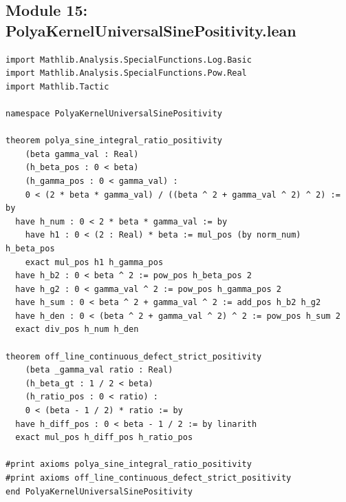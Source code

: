 \documentclass[11pt,a4paper]{article}
\begin{document}
\subsection{Module 15: PolyaKernelUniversalSinePositivity.lean}
\begin{lstlisting}[language=Lean4]
import Mathlib.Analysis.SpecialFunctions.Log.Basic
import Mathlib.Analysis.SpecialFunctions.Pow.Real
import Mathlib.Tactic

namespace PolyaKernelUniversalSinePositivity

theorem polya_sine_integral_ratio_positivity
    (beta gamma_val : Real)
    (h_beta_pos : 0 < beta)
    (h_gamma_pos : 0 < gamma_val) :
    0 < (2 * beta * gamma_val) / ((beta ^ 2 + gamma_val ^ 2) ^ 2) := by
  have h_num : 0 < 2 * beta * gamma_val := by
    have h1 : 0 < (2 : Real) * beta := mul_pos (by norm_num) h_beta_pos
    exact mul_pos h1 h_gamma_pos
  have h_b2 : 0 < beta ^ 2 := pow_pos h_beta_pos 2
  have h_g2 : 0 < gamma_val ^ 2 := pow_pos h_gamma_pos 2
  have h_sum : 0 < beta ^ 2 + gamma_val ^ 2 := add_pos h_b2 h_g2
  have h_den : 0 < (beta ^ 2 + gamma_val ^ 2) ^ 2 := pow_pos h_sum 2
  exact div_pos h_num h_den

theorem off_line_continuous_defect_strict_positivity
    (beta _gamma_val ratio : Real)
    (h_beta_gt : 1 / 2 < beta)
    (h_ratio_pos : 0 < ratio) :
    0 < (beta - 1 / 2) * ratio := by
  have h_diff_pos : 0 < beta - 1 / 2 := by linarith
  exact mul_pos h_diff_pos h_ratio_pos

#print axioms polya_sine_integral_ratio_positivity
#print axioms off_line_continuous_defect_strict_positivity
end PolyaKernelUniversalSinePositivity
\end{lstlisting}
\end{document}
